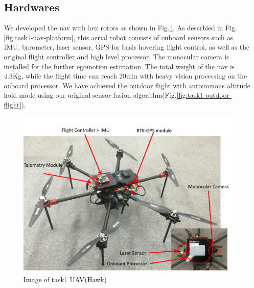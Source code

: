 \documentclass{standalone}
\begin{document}
\subsection{Hardwares}

We developed the uav with hex rotors as shown in Fig.\ref{fig:task1-uav}. As descrbied in  Fig.\ref{fig:task1-uav-platform}, this aerial robot consists of onboard sensors such as IMU, barometer, laser sensor, GPS for basis hovering flight control, as well as the original flight controller and high level processor. The monocular camera is installed for the further egomotion estimation. The total weight of the uav is 4.3Kg, while the flight time can reach 20min with heavy vision processing on the onboard processor. We have achieved the outdoor flight with autonomous altitude hold mode using our original sensor fusion algorithm(Fig.\ref{fig:task1-outdoor-flight}).

\begin{figure}[h]
  \begin{center}
    \includegraphics[clip,  bb=0 0 710 502,  width=\columnwidth]{sections/task1/images/task1-tarrot680.pdf}
    \caption{Image of task1 UAV(Hawk)}
    \label{fig:task1-uav}
  \end{center}
\end{figure} 
\end{document}
